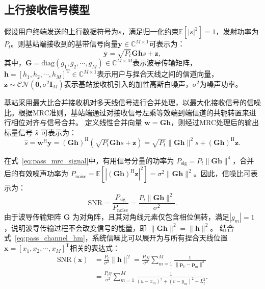 \subsection{上行接收信号模型}

假设用户终端发送的上行数据符号为$s$，满足归一化约束$\mathbb{E}[|s|^2] = 1$，发射功率为$P_t$。则基站端接收到的基带信号向量$\bm{y} \in \mathbb{C}^{M \times 1}$可表示为：
\begin{equation}\label{eq:pass_signal_model}
	\bm{y} = \sqrt{P_t} \bm{G} \bm{h} s + \bm{z},
\end{equation}
其中，$\bm{G} = \mathrm{diag}(g_1, g_2, \cdots, g_M) \in \mathbb{C}^{M \times M}$表示波导传输矩阵，$\bm{h} = [h_1, h_2, \cdots, h_M]^{\mathrm{T}} \in \mathbb{C}^{M \times 1}$表示用户与捏合天线之间的信道向量，$\bm{z} \sim \mathcal{CN}(\bm{0}, \sigma^2 \bm{I}_M)$表示基站接收机引入的加性高斯白噪声，$\sigma^2$为噪声功率。

基站采用最大比合并接收机对多天线信号进行合并处理，以最大化接收信号的信噪比。根据MRC准则，基站端通过对接收信号左乘等效端到端信道的共轭转置来进行相位对齐与信号合并。
定义线性合并向量 $\bm{w} = \bm{G}\bm{h}$，则经过MRC处理后的输出标量信号 $\hat{s}$ 可表示为：
\begin{equation}\label{eq:pass_mrc_signal}
	\hat{s} = \bm{w}^{\mathrm{H}} \bm{y} = (\bm{G}\bm{h})^{\mathrm{H}} (\sqrt{P_t} \bm{G} \bm{h} s + \bm{z}) = \sqrt{P_t}\|\bm{G}\bm{h}\|^2 s + (\bm{G}\bm{h})^{\mathrm{H}} \bm{z}.
\end{equation}

在式~\eqref{eq:pass_mrc_signal}中，有用信号分量的功率为 $P_{\mathrm{sig}} = P_t \|\bm{G}\bm{h}\|^4$，合并后的有效噪声功率为 $P_{\mathrm{noise}} = \mathbb{E}[|(\bm{G}\bm{h})^{\mathrm{H}} \bm{z}|^2] = \sigma^2 \|\bm{G}\bm{h}\|^2$。因此，信噪比可表示为：
\begin{equation}\label{eq:pass_snr_def}
	\mathrm{SNR} = \frac{P_{\mathrm{sig}}}{P_{\mathrm{noise}}} = \frac{P_t \|\bm{G}\bm{h}\|^2}{\sigma^2}.
\end{equation}
由于波导传输矩阵 $\bm{G}$ 为对角阵，且其对角线元素仅包含相位偏转，满足$|g_m| = 1$，说明波导传输过程不会改变信号的能量，即 $\|\bm{G}\bm{h}\|^2 = \|\bm{h}\|^2$。
结合式~\eqref{eq:pass_channel_hm}，系统信噪比可以展开为与所有捏合天线位置$\bm{x} = [x_1, x_2, \cdots, x_M]^{\mathrm{T}}$相关的表达式：
\begin{align}\label{eq:pass_snr_final}
	\mathrm{SNR}(\bm{x}) &= \frac{P_t}{\sigma^2} \|\bm{h}\|^2 
	= \frac{P_t \eta}{\sigma^2} \sum_{m=1}^M \frac{1}{\|\bm{p}_U - \bm{p}_m\|^2} \nonumber \\
	&= \frac{P_t \eta}{\sigma^2} \sum_{m=1}^M \frac{1}{(u - x_m)^2 + (v - y_m)^2 + L_z^2}.
\end{align}

